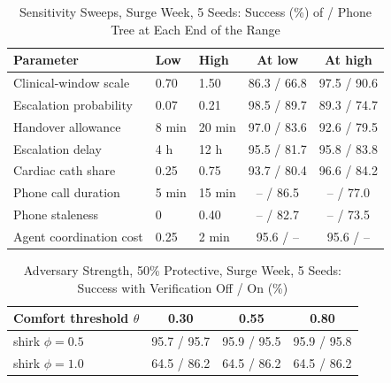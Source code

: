 \begin{table}[!t]
\centering
\caption{Sensitivity Sweeps, Surge Week, 5 Seeds: Success (\%) of \mahros{} / Phone Tree at Each End of the Range}
\label{tab:sens}
\scriptsize
\setlength{\tabcolsep}{2.5pt}
\begin{tabular}{@{}lllcc@{}}
\toprule
Parameter & Low & High & At low & At high \\
\midrule
Clinical-window scale & 0.70 & 1.50 & 86.3 / 66.8 & 97.5 / 90.6 \\
Escalation probability & 0.07 & 0.21 & 98.5 / 89.7 & 89.3 / 74.7 \\
Handover allowance & 8 min & 20 min & 97.0 / 83.6 & 92.6 / 79.5 \\
Escalation delay & 4 h & 12 h & 95.5 / 81.7 & 95.8 / 83.8 \\
Cardiac cath share & 0.25 & 0.75 & 93.7 / 80.4 & 96.6 / 84.2 \\
Phone call duration & 5 min & 15 min & -- / 86.5 & -- / 77.0 \\
Phone staleness & 0 & 0.40 & -- / 82.7 & -- / 73.5 \\
Agent coordination cost & 0.25 & 2 min & 95.6 / -- & 95.6 / -- \\
\bottomrule
\end{tabular}
\end{table}

\begin{table}[!t]
\centering
\caption{Adversary Strength, 50\% Protective, Surge Week, 5 Seeds: Success with Verification Off / On (\%)}
\label{tab:adv-strength}
\scriptsize
\setlength{\tabcolsep}{4pt}
\begin{tabular}{@{}lccc@{}}
\toprule
Comfort threshold $\theta$ & 0.30 & 0.55 & 0.80 \\
\midrule
shirk $\phi=0.5$ & 95.7 / 95.7 & 95.9 / 95.5 & 95.9 / 95.8 \\
shirk $\phi=1.0$ & 64.5 / 86.2 & 64.5 / 86.2 & 64.5 / 86.2 \\
\bottomrule
\end{tabular}
\end{table}


